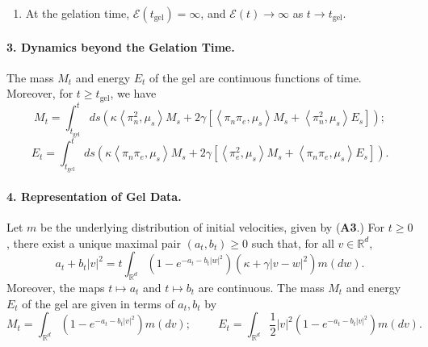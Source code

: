 \begin{theorem}
\begin{enumerate}[label=\roman{*}).]
    \item At the gelation time, $\mathcal{E}(t_\mathrm{gel})=\infty$, and $\mathcal{E}(t)\rightarrow \infty$ as $t\rightarrow t_\mathrm{gel}.$ 
\end{enumerate}

\paragraph{3. Dynamics beyond the Gelation Time.} The mass $M_t$ and energy $E_t$ of the gel are continuous functions of time. Moreover, for $t\geq t_\mathrm{gel}$, we have 
\begin{equation}
    M_t=\int_{t_\mathrm{gel}}^t ds
    \left(
      \kappa \left<\pi_n^2,\mu_s\right>M_s +
      2\gamma \left[
        \left<\pi_n \pi_e,\mu_s \right>M_s +
        \left<\pi_n^2,\mu_s \right>E_s \right]
    \right);
\end{equation}
\begin{equation}
    E_t=\int_{t_\mathrm{gel}}^t ds
    \left(
      \kappa \left<\pi_n \pi_e,\mu_s\right>M_s +
      2\gamma \left[
        \left<\pi_e^2,\mu_s \right>M_s +
        \left<\pi_n \pi_e,\mu_s \right>E_s \right]
    \right).
\end{equation}
\paragraph{4. Representation of Gel Data.} Let $m$ be the underlying distribution of initial velocities, given by (\textbf{A3}.) For $t\ge 0$, there exist a unique maximal pair $(a_t, b_t) \ge 0$ such that, for all $v\in \mathbb{R}^d$, \begin{equation}\label{eq: NLFP 1} a_t+b_t|v|^2=t \int_{\mathbb{R}^d} (1-e^{-a_t-b_t|w|^2})(\kappa+\gamma|v-w|^2)m(dw). \end{equation} Moreover, the maps $t\mapsto a_t$ and $t\mapsto b_t$ are continuous. The mass $M_t$ and energy $E_t$ of the gel are given in terms of $a_t, b_t$ by \begin{equation}\label{eq: formula for M, E_0}
    M_t = \int_{\mathbb{R}^d} (1-e^{-a_t-b_t|v|^2})m(dv); \hspace{1cm} E_t=\int_{\mathbb{R}^d} \frac{1}{2}|v|^2(1-e^{-a_t-b_t|v|^2})m(dv).
\end{equation}

\end{theorem}
